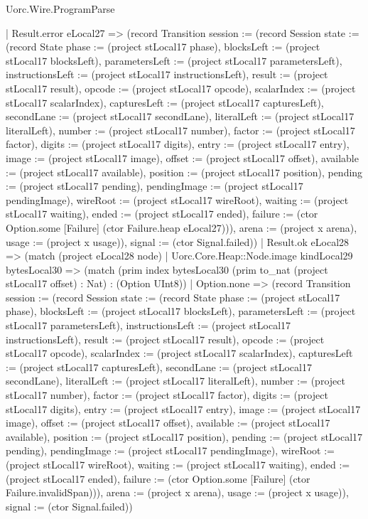 \begin{lexlean}{Uorc.Wire.ProgramParse}
\begin{semanticmodule}
{        | Result.error eLocal27 => (record Transition {session := (record Session {state := (record State {phase := (project stLocal17 phase), blocksLeft := (project stLocal17 blocksLeft), parametersLeft := (project stLocal17 parametersLeft), instructionsLeft := (project stLocal17 instructionsLeft), result := (project stLocal17 result), opcode := (project stLocal17 opcode), scalarIndex := (project stLocal17 scalarIndex), capturesLeft := (project stLocal17 capturesLeft), secondLane := (project stLocal17 secondLane), literalLeft := (project stLocal17 literalLeft), number := (project stLocal17 number), factor := (project stLocal17 factor), digits := (project stLocal17 digits), entry := (project stLocal17 entry), image := (project stLocal17 image), offset := (project stLocal17 offset), available := (project stLocal17 available), position := (project stLocal17 position), pending := (project stLocal17 pending), pendingImage := (project stLocal17 pendingImage), wireRoot := (project stLocal17 wireRoot), waiting := (project stLocal17 waiting), ended := (project stLocal17 ended), failure := (ctor Option.some [Failure] (ctor Failure.heap eLocal27))}), arena := (project x arena), usage := (project x usage)}), signal := (ctor Signal.failed)})
        | Result.ok eLocal28 => (match (project eLocal28 node)
          | Uorc.Core.Heap::Node.image kindLocal29 bytesLocal30 => (match (prim index bytesLocal30 (prim to_nat (project stLocal17 offset) : Nat) : (Option UInt8))
            | Option.none => (record Transition {session := (record Session {state := (record State {phase := (project stLocal17 phase), blocksLeft := (project stLocal17 blocksLeft), parametersLeft := (project stLocal17 parametersLeft), instructionsLeft := (project stLocal17 instructionsLeft), result := (project stLocal17 result), opcode := (project stLocal17 opcode), scalarIndex := (project stLocal17 scalarIndex), capturesLeft := (project stLocal17 capturesLeft), secondLane := (project stLocal17 secondLane), literalLeft := (project stLocal17 literalLeft), number := (project stLocal17 number), factor := (project stLocal17 factor), digits := (project stLocal17 digits), entry := (project stLocal17 entry), image := (project stLocal17 image), offset := (project stLocal17 offset), available := (project stLocal17 available), position := (project stLocal17 position), pending := (project stLocal17 pending), pendingImage := (project stLocal17 pendingImage), wireRoot := (project stLocal17 wireRoot), waiting := (project stLocal17 waiting), ended := (project stLocal17 ended), failure := (ctor Option.some [Failure] (ctor Failure.invalidSpan))}), arena := (project x arena), usage := (project x usage)}), signal := (ctor Signal.failed)})
}
\end{semanticmodule}
\end{lexlean}
